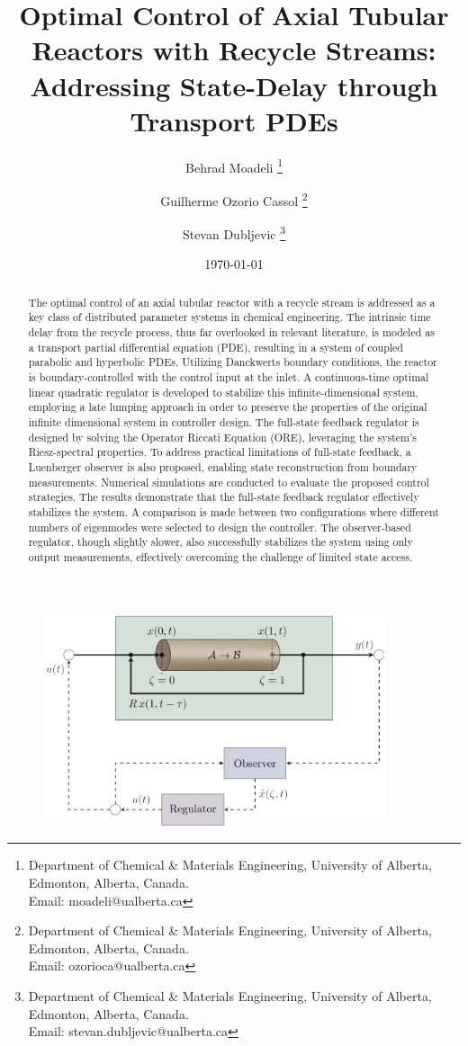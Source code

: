 \documentclass[letterpaper,11pt]{article}
\title{Optimal Control of Axial Tubular Reactors with Recycle Streams:\\Addressing State-Delay through Transport PDEs}
\author{
  Behrad Moadeli \thanks{Department of Chemical \& Materials Engineering, University of Alberta, Edmonton, Alberta, Canada. \\Email: moadeli@ualberta.ca} \and
  Guilherme Ozorio Cassol \thanks{Department of Chemical \& Materials Engineering, University of Alberta, Edmonton, Alberta, Canada. \\Email: ozorioca@ualberta.ca} \and
  Stevan Dubljevic \thanks{Department of Chemical \& Materials Engineering, University of Alberta, Edmonton, Alberta, Canada. \\Email: stevan.dubljevic@ualberta.ca}
}
\date{\today}
\begin{document}
\maketitle

\begin{figure}[htbp!]
  \centering
  \includegraphics*[width=0.9\textwidth]{Figures/abstract_large.PNG}
\end{figure}

\newpage
\begin{abstract}
    The optimal control of an axial tubular reactor with a recycle stream is addressed as a key class of distributed parameter systems in chemical engineering. The intrinsic time delay from the recycle process, thus far overlooked in relevant literature, is modeled as a transport partial differential equation (PDE), resulting in a system of coupled parabolic and hyperbolic PDEs. Utilizing Danckwerts boundary conditions, the reactor is boundary-controlled with the control input at the inlet. A continuous-time optimal linear quadratic regulator is developed to stabilize this infinite-dimensional system, employing a late lumping approach in order to preserve the properties of the original infinite dimensional system in controller design. The full-state feedback regulator is designed by solving the Operator Riccati Equation (ORE), leveraging the system's Riesz-spectral properties. To address practical limitations of full-state feedback, a Luenberger observer is also proposed, enabling state reconstruction from boundary measurements. 
    Numerical simulations are conducted to evaluate the proposed control strategies. The results demonstrate that the full-state feedback regulator effectively stabilizes the system. A comparison is made between two configurations where different numbers of eigenmodes were selected to design the controller. The observer-based regulator, though slightly slower, also successfully stabilizes the system using only output measurements, effectively overcoming the challenge of limited state access.
\end{abstract}
\end{document}
